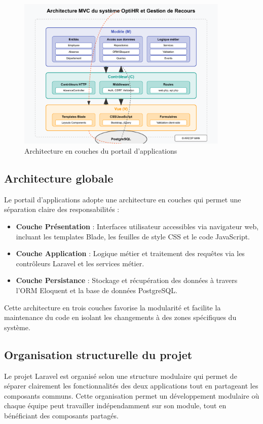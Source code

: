 \begin{figure}[H]
    \centering
    \includegraphics[width=0.9\textwidth]{images/diagrammes/architecture/architecture-couches.pdf}
    \caption{Architecture en couches du portail d'applications}
    \label{fig:architecture_couches}
\end{figure}

\subsection{Architecture globale}
Le portail d'applications adopte une architecture en couches qui permet une séparation claire des responsabilités :

\begin{itemize}
    \item \textbf{Couche Présentation} : Interfaces utilisateur accessibles via navigateur web, incluant les templates Blade, les feuilles de style CSS et le code JavaScript.
    \item \textbf{Couche Application} : Logique métier et traitement des requêtes via les contrôleurs Laravel et les services métier.
    \item \textbf{Couche Persistance} : Stockage et récupération des données à travers l'ORM Eloquent et la base de données PostgreSQL.
\end{itemize}

Cette architecture en trois couches favorise la modularité et facilite la maintenance du code en isolant 
les changements à des zones spécifiques du système.

\subsection{Organisation structurelle du projet}
Le projet Laravel est organisé selon une structure modulaire qui permet de séparer clairement les fonctionnalités des deux applications tout en partageant les composants communs.
Cette organisation permet un développement modulaire où chaque équipe peut travailler indépendamment sur son module, tout en bénéficiant des composants partagés.

